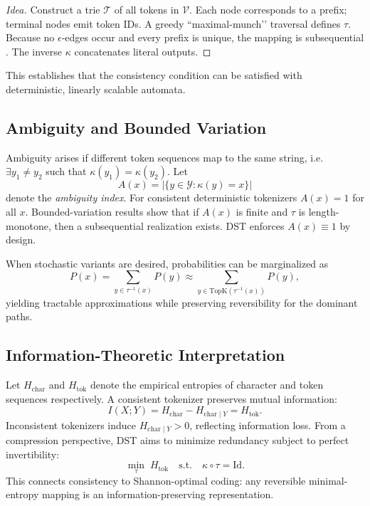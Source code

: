 \begin{proof}[Idea]
Construct a trie $\mathcal{T}$ of all tokens in $\mathcal{V}$.
Each node corresponds to a prefix; terminal nodes emit token IDs.
A greedy “maximal-munch’’ traversal defines $\tau$.
Because no $\epsilon$-edges occur and every prefix is unique,
the mapping is subsequential \citep{choffrut1979sequential}.
The inverse $\kappa$ concatenates literal outputs.
\end{proof}

This establishes that the consistency condition
can be satisfied with deterministic, linearly scalable automata.

\subsection{Ambiguity and Bounded Variation}

Ambiguity arises if different token sequences map to the same string,
i.e.\ $\exists y_1\ne y_2$ such that $\kappa(y_1)=\kappa(y_2)$.
Let
\[
A(x)=|\{y\in\mathcal{Y}:\kappa(y)=x\}|
\]
denote the \emph{ambiguity index}.
For consistent deterministic tokenizers $A(x)=1$ for all $x$.
Bounded-variation results \citep{mohri1997finite}
show that if $A(x)$ is finite and $\tau$ is length-monotone,
then a subsequential realization exists.
DST enforces $A(x)\!\equiv\!1$ by design.

When stochastic variants are desired,
probabilities can be marginalized as
\[
P(x)=\sum_{y\in\tau^{-1}(x)}P(y)
\approx\sum_{y\in\mathrm{TopK}(\tau^{-1}(x))}P(y),
\]
yielding tractable approximations while preserving reversibility
for the dominant paths.

\subsection{Information-Theoretic Interpretation}

Let $H_{\text{char}}$ and $H_{\text{tok}}$
denote the empirical entropies of character
and token sequences respectively.
A consistent tokenizer preserves mutual information:
\[
I(X;Y)=H_{\text{char}}-H_{\text{char}\mid Y}=H_{\text{tok}}.
\]
Inconsistent tokenizers induce
$H_{\text{char}\mid Y}>0$,
reflecting information loss.
From a compression perspective,
DST aims to minimize redundancy
subject to perfect invertibility:
\[
\min_{\tau}\; H_{\text{tok}} \quad
\text{s.t.}\quad \kappa\!\circ\!\tau = \mathrm{Id}.
\]
This connects consistency to Shannon-optimal coding:
any reversible minimal-entropy mapping is
an information-preserving representation.

